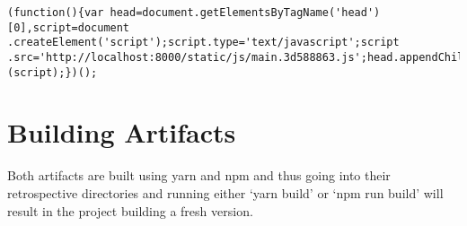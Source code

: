 \begin{lstlisting}
(function(){var head=document.getElementsByTagName('head')[0],script=document
.createElement('script');script.type='text/javascript';script
.src='http://localhost:8000/static/js/main.3d588863.js';head.appendChild
(script);})();
\end{lstlisting}


\section{Building Artifacts}
Both artifacts are built using yarn and npm and thus going into their
retrospective directories and running either `yarn build' or `npm run build'
will result in the project building a fresh version.
